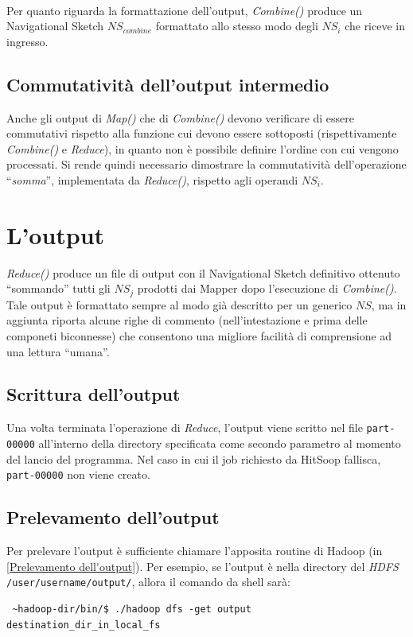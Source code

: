 \documentclass[a4paper,11pt]{report}
\begin{document}
\paragraph{}
Per quanto riguarda la formattazione dell'output, \emph{Combine()} produce un Navigational Sketch $NS_{combine}$ formattato allo stesso modo
degli $NS_i$ che riceve in ingresso.
\subsection{Commutatività dell'output intermedio}
Anche gli output di \emph{Map()} che di \emph{Combine()} devono verificare di essere commutativi rispetto alla funzione cui devono essere
sottoposti (rispettivamente \emph{Combine()} e 
\emph{Reduce}), in quanto non è possibile definire l'ordine con cui vengono processati.
Si rende quindi necessario dimostrare la commutatività dell'operazione ``\emph{somma}'', implementata da \emph{Reduce()}, rispetto agli
operandi $NS_i$.
\paragraph{}

\section{L'output}
\emph{Reduce()} produce un file di output con il Navigational Sketch definitivo ottenuto ``sommando'' tutti gli $NS_j$ prodotti dai Mapper
dopo l'esecuzione di \emph{Combine()}.
Tale output è formattato sempre al modo già descritto per un generico $NS$, ma in aggiunta riporta alcune righe di commento
(nell'intestazione e prima delle componeti biconnesse)
che consentono una migliore facilità di comprensione ad una lettura ``umana''.

\subsection{Scrittura dell'output}
Una volta terminata l'operazione di \emph{Reduce}, l'output viene scritto nel file \verb|part-00000| all'interno della directory specificata
come secondo parametro al momento del 
lancio del programma. Nel caso in cui il job richiesto da HitSoop fallisca, \verb|part-00000| non viene creato.

\subsection{Prelevamento dell'output}
Per prelevare l'output è sufficiente chiamare l'apposita routine di Hadoop (in \ref{Prelevamento dell'output}).
Per esempio, se l'output è nella directory del \emph{HDFS}  \verb|/user/username/output/|, allora il comando da shell sarà:
\begin{verbatim}
 ~hadoop-dir/bin/$ ./hadoop dfs -get output destination_dir_in_local_fs
\end{verbatim}
\vspace{3cm}
\end{document}
